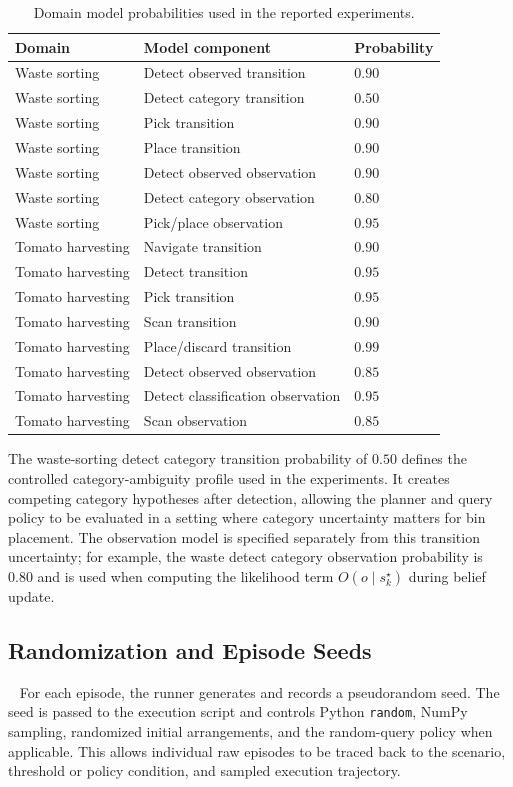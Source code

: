 \begin{table}[h]
\centering
\caption{Domain model probabilities used in the reported experiments.}
\label{tab:app_model_params}
\small
\begin{tabular}{lll}
\toprule
\textbf{Domain} & \textbf{Model component} & \textbf{Probability} \\
\midrule
Waste sorting & Detect observed transition & $0.90$ \\
Waste sorting & Detect category transition & $0.50$ \\
Waste sorting & Pick transition & $0.90$ \\
Waste sorting & Place transition & $0.90$ \\
Waste sorting & Detect observed observation & $0.90$ \\
Waste sorting & Detect category observation & $0.80$ \\
Waste sorting & Pick/place observation & $0.95$ \\
\midrule
Tomato harvesting & Navigate transition & $0.90$ \\
Tomato harvesting & Detect transition & $0.95$ \\
Tomato harvesting & Pick transition & $0.95$ \\
Tomato harvesting & Scan transition & $0.90$ \\
Tomato harvesting & Place/discard transition & $0.99$ \\
Tomato harvesting & Detect observed observation & $0.85$ \\
Tomato harvesting & Detect classification observation & $0.95$ \\
Tomato harvesting & Scan observation & $0.85$ \\
\bottomrule
\end{tabular}
\end{table}

The waste-sorting detect category transition probability of $0.50$ defines the controlled category-ambiguity profile used in the experiments. It creates competing category hypotheses after detection, allowing the planner and query policy to be evaluated in a setting where category uncertainty matters for bin placement. The observation model is specified separately from this transition uncertainty; for example, the waste detect category observation probability is $0.80$ and is used when computing the likelihood term $O(o \mid s_k^{\star})$ during belief update.

\subsection{Randomization and Episode Seeds}~\label{appx:randomization}
For each episode, the runner generates and records a pseudorandom seed. The seed is passed to the execution script and controls Python \texttt{random}, NumPy sampling, randomized initial arrangements, and the random-query policy when applicable. This allows individual raw episodes to be traced back to the scenario, threshold or policy condition, and sampled execution trajectory.

